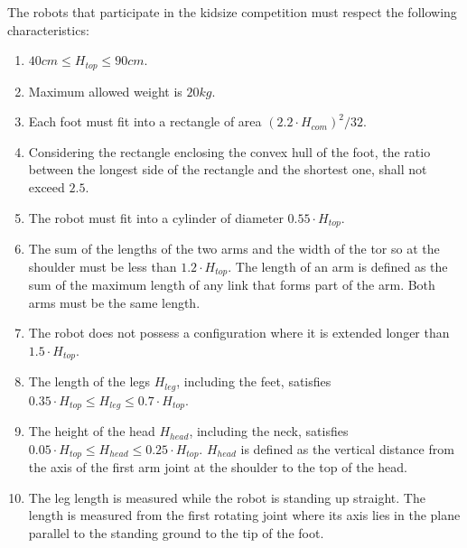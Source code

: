 The robots that participate in the kidsize competition must respect the following characteristics\cite{robocup_rules}:\begin{enumerate}
\item $40cm \leq H_{top} \leq 90cm$.

\item Maximum allowed weight is $20kg$.

\item Each foot must fit into a rectangle of area
$(2.2 \cdot H_{com})^2/32$.

\item Considering the rectangle enclosing the convex hull of the foot, the ratio between the longest side of the rectangle and the shortest one, shall not exceed $2.5$.

\item The robot must fit into a cylinder of diameter $0.55 \cdot H_{top}$.

\item The sum of the lengths of the two arms and the width of the tor
so at the shoulder must be less than $1.2\cdot H_{top}$. The length of an arm is defined as the sum of the maximum length of any link that forms part of the arm. Both arms must be the same length.

\item The robot does not possess a configuration where it is extended longer than $1.5 \cdot H_{top}$.

\item The length of the legs $H_{leg}$, including the feet, satisfies $0.35 \cdot H_{top} \leq H_{leg} \leq 0.7 \cdot H_{top}$.

\item The height of the head $H_{head}$, including the neck, satisfies $0.05 \cdot H_{top} \leq H_{head} \leq 0.25 \cdot H_{top}$. $H_{head}$ is defined as the vertical distance from the axis of the first arm
joint at the shoulder to the top of the head.

\item The leg length is measured while the robot is standing up straight. The length is measured from the first rotating joint where its axis lies in the plane parallel to the standing ground to the tip of the foot.
\end{enumerate}
